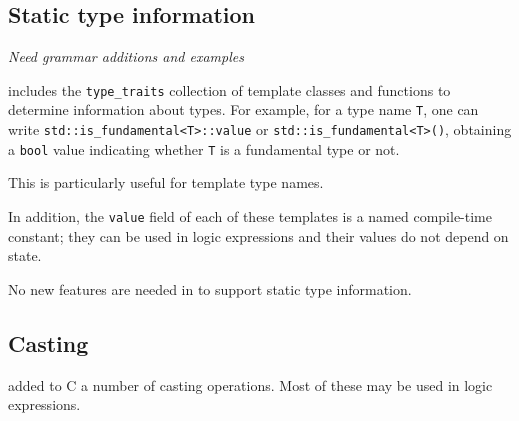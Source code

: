 \subsection{Static type information}

\emph{Need grammar additions and examples}

\lang includes the \lstinline|type_traits| collection of template classes and functions to determine information about types.
For example, for a type name \lstinline|T|, one can write
\lstinline|std::is_fundamental<T>::value| or
\lstinline|std::is_fundamental<T>()|, obtaining a 
\lstinline|bool| value indicating whether 
\lstinline|T| is a fundamental type or not.

This is particularly useful for template type names.

In addition, the \lstinline|value| field of each of these templates is a named \lang compile-time constant; they can be used in logic expressions and their values do not depend on state.

No new features are needed in \NAME to support static type information. 


\subsection{Casting}
\label{sec:casts}




\lang added to C a number of casting operations. Most of these may be 
used in logic expressions.

